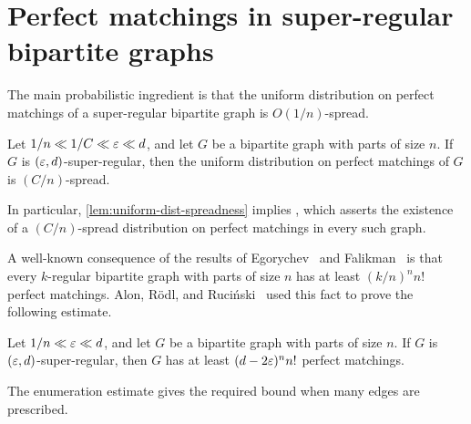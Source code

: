 \documentclass[11pt]{amsart}
\begin{document}
\section{Perfect matchings in super-regular bipartite graphs}\label{sect:pm-in-super-regular}

The main probabilistic ingredient is that the uniform distribution on perfect
matchings of a super-regular bipartite graph is $O(1/n)$-spread.

\begin{lemma}\label{lem:uniform-dist-spreadness}
Let $1 / n \ll 1 / C \ll \varepsilon \ll d$, and let $G$ be a bipartite graph with parts of size $n$.  
If $G$ is $(\varepsilon, d)$-super-regular, then the uniform distribution on perfect matchings of $G$ is $(C / n)$-spread.
\end{lemma}

In particular, \cref{lem:uniform-dist-spreadness} implies
\cite[Theorem 4.2]{PSSS22}, which asserts the existence of a $(C/n)$-spread
distribution on perfect matchings in every such graph.

A well-known consequence of the results of Egorychev~\cite{Eg81} and
Falikman~\cite{Fa81} is that every $k$-regular bipartite graph with parts of
size $n$ has at least $(k/n)^n n!$ perfect matchings.  Alon, R\"{o}dl, and
Ruci\'{n}ski~\cite{ARR98} used this fact to prove the following estimate.

\begin{lemma}\label{lem:matchings-enumeration}
    Let $1 / n \ll \varepsilon \ll d$, and let $G$ be a bipartite graph with parts of size $n$.
    If $G$ is $(\varepsilon, d)$-super-regular, then $G$ has at least $(d - 2\varepsilon)^n n!$ perfect matchings.
\end{lemma}

The enumeration estimate gives the required bound when many edges are
prescribed.
\end{document}
